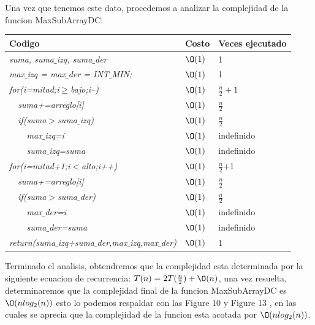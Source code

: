 \documentclass[spanish]{article}
\begin{document}
	Una vez que tenemos este dato, procedemos a analizar la complejidad de la funcion MaxSubArrayDC:
	\begin{center}
		\begin{table}[H]
			\begin{tabular}{|l|l|l|}
				\hline
				\rowcolor[HTML]{FFCC67} 
				Codigo                           & Costo & Veces ejecutado \\ \hline
				\textit{suma, suma$\_$izq, suma$\_$der}                    & $\O(1)$    & 1               \\ \hline
				\textit{max$\_$izq = max$\_$der = INT$\_$MIN;}                    & $\O(1)$    & 1               \\ \hline								
				\textit{for(i=mitad;i$\geq$bajo;i--)} & $\O(1)$    & $\frac{n}{2}+1$             \\ \hline
				\textit{\  \  suma+=arreglo[i]}                 & $\O(1)$    & $\frac{n}{2}$               \\ \hline
				\textit{\  \  if(suma$>$suma$\_$izq)}                 & $\O(1)$    & $\frac{n}{2}$               \\ \hline
				\textit{\  \  \  \  max$\_$izq=i}                     & $\O(1)$    & indefinido              \\ \hline
				\textit{\  \  \  \  suma$\_$izq=suma}                     & $\O(1)$    & indefinido              \\ \hline				
				\textit{for(i=mitad+1;i$<$alto;i++)} & $\O(1)$    & $\frac{n}{2}$+1             \\ \hline
				\textit{\  \  suma+=arreglo[i]}                 & $\O(1)$    & $\frac{n}{2}$               \\ \hline
				\textit{\  \  if(suma$>$suma$\_$der)}                 & $\O(1)$    & $\frac{n}{2}$               \\ \hline
				\textit{\  \  \  \  max$\_$der=i}                     & $\O(1)$    & indefinido              \\ \hline
				\textit{\  \  \  \  suma$\_$der=suma}                     & $\O(1)$    & indefinido              \\ \hline			
				\textit{return(suma$\_$izq+suma$\_$der,max$\_$izq,max$\_$der)}                     & $\O(1)$    & 1              \\ \hline			
			\end{tabular}
		\end{table}										
	\end{center}
	Terminado el analisis, obtendremos que la complejidad esta determinada por la siguiente ecuacion de recurrencia: $T(n) = 2T(\frac{n}{2})+\O(n)$, una vez resuelta, determinaremos que la complejidad final de la funcion MaxSubArrayDC es $\O(nlog_2(n))$ esto lo podemos respaldar con las Figure 10 y Figure 13 , en las cuales se aprecia que la complejidad de la funcion esta acotada por $\O(nlog_2(n))$.
\end{document}
